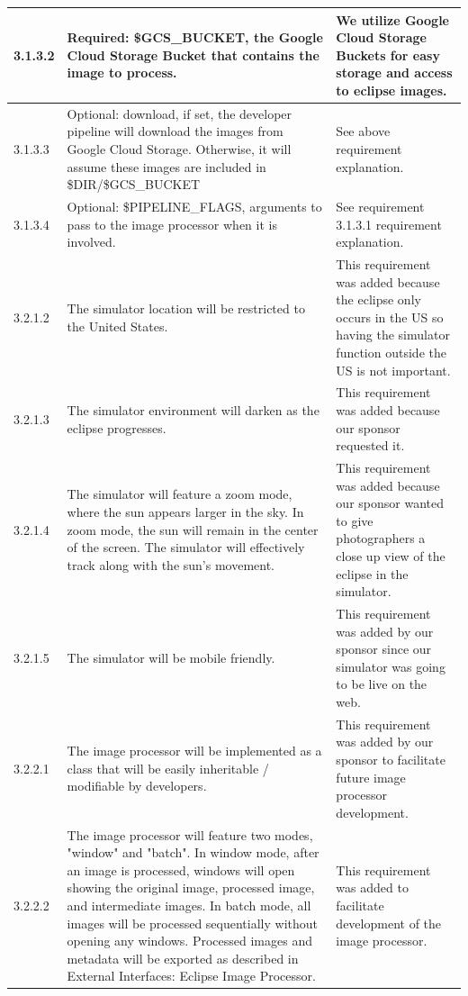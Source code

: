 \documentclass[10pt, onecolumn, draftclsnofoot, letterpaper, compsoc]{IEEEtran}
\begin{document}
\begin{longtable}{| p{} | p{} | p{} |}
    3.1.3.2 &
    Required: \$GCS\_BUCKET, the Google Cloud Storage Bucket that contains the image
    to process. &
    We utilize Google Cloud Storage Buckets for easy storage and access to
    eclipse images.
    \\ \hline

    3.1.3.3 &
    Optional: download, if set, the developer pipeline will download the images
    from Google Cloud Storage. Otherwise, it will assume these images are included
    in \$DIR/\$GCS\_BUCKET &
    See above requirement explanation.
    \\ \hline

    3.1.3.4 &
    Optional: \$PIPELINE\_FLAGS, arguments to pass to the image processor when
    it is involved. &
    See requirement 3.1.3.1 requirement explanation.
    \\ \hline

    3.2.1.2 &
	The simulator location will be restricted to the United States. &
	This requirement was added because the eclipse only occurs in the US so having the
    simulator function outside the US is not important.
	\\ \hline

    3.2.1.3 &
	The simulator environment will darken as the eclipse progresses. &
	This requirement was added because our sponsor requested it.
	\\ \hline

    3.2.1.4 &
    The simulator will feature a zoom mode, where the sun appears larger in the sky. In zoom mode, the sun
    will remain in the center of the screen. The simulator will effectively track along with the sun’s movement. &
	This requirement was added because our sponsor wanted to give photographers a close up
    view of the eclipse in the simulator.
	\\ \hline

    3.2.1.5 &
	The simulator will be mobile friendly. &
	This requirement was added by our sponsor since our simulator was going to be live on the web.
	\\ \hline

    3.2.2.1 &
    The image processor will be implemented as a class that will be easily inheritable / modifiable by
    developers. &
	This requirement was added by our sponsor to facilitate future image processor development.
	\\ \hline

    3.2.2.2 &
    The image processor will feature two modes, "window" and "batch". In window mode, after an image is
    processed, windows will open showing the original image, processed image, and intermediate images. In
    batch mode, all images will be processed sequentially without opening any windows. Processed images
    and metadata will be exported as described in External Interfaces: Eclipse Image Processor. &
	This requirement was added to facilitate development of the image processor.
	\\ \hline


\end{longtable}
\end{document}
